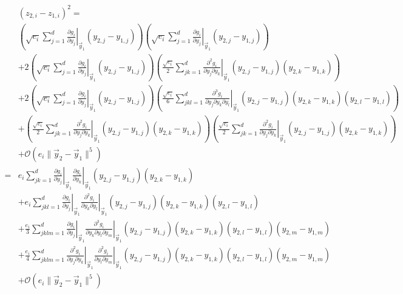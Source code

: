 \documentclass[12pt]{article}
\begin{document}
\begin{equation}
\begin{aligned}
& (z_{2,i} - z_{1,i})^2 = \\ 
& \left( \sqrt{e_i} \sum_{j=1}^d \left. \frac{\partial g_i}{\partial y_j} \right|_{\vec{y}_1} (y_{2,j}-y_{1,j}) \right) \left( \sqrt{e_i} \sum_{j=1}^d \left. \frac{\partial g_i}{\partial y_j} \right|_{\vec{y}_1} (y_{2,j}-y_{1,j}) \right) \\
&+ 2 \left( \sqrt{e_i} \sum_{j=1}^d \left. \frac{\partial g_i}{\partial y_j} \right|_{\vec{y}_1} (y_{2,j}-y_{1,j}) \right) \left( \frac{\sqrt{e_i}}{2} \sum_{jk=1}^d \left. \frac{\partial^2 g_i}{\partial y_j \partial y_k} \right|_{\vec{y}_1} (y_{2,j}-y_{1,j}) (y_{2,k}-y_{1,k}) \right) \\
&+ 2 \left( \sqrt{e_i} \sum_{j=1}^d \left. \frac{\partial g_i}{\partial y_j} \right|_{\vec{y}_1} (y_{2,j}-y_{1,j}) \right) \left( \frac{\sqrt{e_i}}{6} \sum_{jkl=1}^d \left. \frac{\partial^3 g_i}{\partial y_j \partial y_k \partial y_l} \right|_{\vec{y}_1} (y_{2,j}-y_{1,j}) (y_{2,k}-y_{1,k}) (y_{2,l}-y_{1,l}) \right) \\
&+ \left( \frac{\sqrt{e_i}}{2} \sum_{jk=1}^d \left. \frac{\partial^2 g_i}{\partial y_j \partial y_k} \right|_{\vec{y}_1} (y_{2,j}-y_{1,j}) (y_{2,k}-y_{1,k}) \right) \left( \frac{\sqrt{e_i}}{2} \sum_{jk=1}^d \left. \frac{\partial^2 g_i}{\partial y_j \partial y_k} \right|_{\vec{y}_1} (y_{2,j}-y_{1,j}) (y_{2,k}-y_{1,k}) \right) \\
&+ \mathcal{O}( e_i \|\vec{y}_2 - \vec{y}_1 \|^5) \\
=& e_i \sum_{jk=1}^d \left. \frac{\partial g_i}{\partial y_j} \right|_{\vec{y}_1} \left. \frac{\partial g_i}{\partial y_k} \right|_{\vec{y}_1} (y_{2,j}-y_{1,j}) (y_{2,k}-y_{1,k}) \\
&+ e_i \sum_{jkl=1}^d \left. \frac{\partial g_i}{\partial y_j} \right|_{\vec{y}_1} \left. \frac{\partial^2 g_i}{\partial y_k \partial y_l} \right|_{\vec{y}_1} (y_{2,j}-y_{1,j})  (y_{2,k}-y_{1,k}) (y_{2,l}-y_{1,l}) \\
&+ \frac{e_i}{3} \sum_{jklm=1}^d \left. \frac{\partial g_i}{\partial y_j} \right|_{\vec{y}_1} \left. \frac{\partial^3 g_i}{ \partial y_k \partial y_l \partial y_m} \right|_{\vec{y}_1} (y_{2,j}-y_{1,j}) (y_{2,k}-y_{1,k}) (y_{2,l}-y_{1,l})(y_{2,m}-y_{1,m}) \\
&+ \frac{e_i}{4} \sum_{jklm=1}^d \left. \frac{\partial^2 g_i}{\partial y_j \partial y_k} \right|_{\vec{y}_1} \left. \frac{\partial^2 g_i}{\partial y_l \partial y_m} \right|_{\vec{y}_1} (y_{2,j}-y_{1,j}) (y_{2,k}-y_{1,k}) (y_{2,l}-y_{1,l}) (y_{2,m}-y_{1,m}) \\
&+ \mathcal{O}(e_i \|\vec{y}_2 - \vec{y}_1 \|^5)
\end{aligned}
\end{equation}
\end{document}
